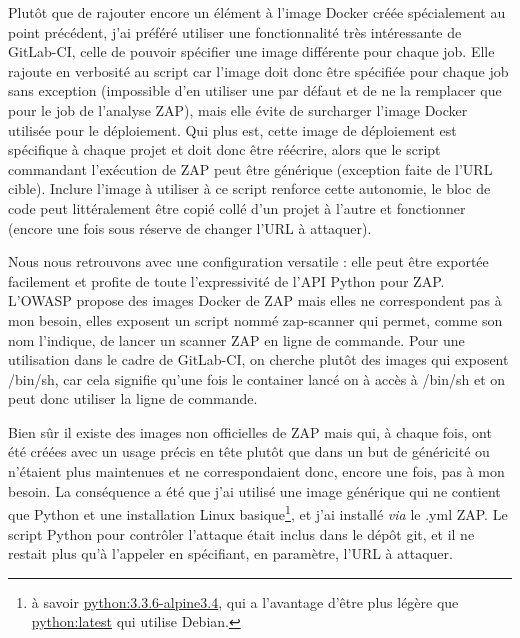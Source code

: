 Plutôt que de rajouter encore un élément à l'image Docker créée spécialement au point précédent, j'ai préféré utiliser une fonctionnalité très intéressante de GitLab-CI, celle de pouvoir spécifier une image différente pour chaque job. Elle rajoute en verbosité au script car l'image doit donc être spécifiée pour chaque job sans exception (impossible d'en utiliser une par défaut et de ne la remplacer que pour le job de l'analyse ZAP), mais elle évite de surcharger l'image Docker utilisée pour le déploiement. Qui plus est, cette image de déploiement est spécifique à chaque projet et doit donc être réécrire, alors que le script commandant l'exécution de ZAP peut être générique (exception faite de l'URL cible). Inclure l'image à utiliser à ce script renforce cette autonomie, le bloc de code peut littéralement être copié collé d'un projet à l'autre et fonctionner (encore une fois sous réserve de changer l'URL à attaquer).

Nous nous retrouvons avec une configuration versatile : elle peut être exportée facilement et profite de toute l'expressivité de l'API Python pour ZAP. L'OWASP propose des images Docker de ZAP\cite{zap_wiki_docker}\cite{zap_depot_docker} mais elles ne correspondent pas à mon besoin, elles exposent un script nommé zap-scanner qui permet, comme son nom l'indique, de lancer un scanner ZAP en ligne de commande. Pour une utilisation dans le cadre de GitLab-CI, on cherche plutôt des images qui exposent /bin/sh, car cela signifie qu'une fois le container lancé on à accès à /bin/sh et on peut donc utiliser la ligne de commande.

Bien sûr il existe des images non officielles de ZAP\cite{zap_maven} mais qui, à chaque fois, ont été créées avec un usage précis en tête plutôt que dans un but de généricité ou n'étaient plus maintenues et ne correspondaient donc, encore une fois, pas à mon besoin. La conséquence a été que j'ai utilisé une image générique qui ne contient que Python et une installation Linux basique\footnote{à savoir \href{https://github.com/docker-library/python/blob/d3c5f47b788adb96e69477dadfb0baca1d97f764/3.3/alpine3.4/Dockerfile}{python:3.3.6-alpine3.4}, qui a l'avantage d'être plus légère que \href{https://github.com/docker-library/python/blob/d3c5f47b788adb96e69477dadfb0baca1d97f764/3.6/jessie/Dockerfile}{python:latest} qui utilise Debian.}, et j'ai installé \textit{via} le .yml ZAP. Le script Python pour contrôler l'attaque était inclus dans le dépôt git, et il ne restait plus qu'à l'appeler en spécifiant, en paramètre, l'URL à attaquer.

